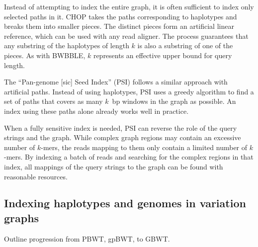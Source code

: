 Instead of attempting to index the entire graph, it is often sufficient to index only selected paths in it.
CHOP \cite{Mokveld_2018} takes the paths corresponding to haplotypes and breaks them into smaller pieces.
The distinct pieces form an artificial linear reference, which can be used with any read aligner.
The process guarantees that any substring of the haplotypes of length $k$ is also a substring of one of the pieces.
As with BWBBLE, $k$ represents an effective upper bound for query length.

The ``Pan-genome [sic] Seed Index'' (PSI) \cite{Ghaffaari_2019} follows a similar approach with artificial paths.
Instead of using haplotypes, PSI uses a greedy algorithm to find a set of paths that covers as many $k$~bp windows in the graph as possible.
An index using these paths alone already works well in practice.

When a fully sensitive index is needed, PSI can reverse the role of the query strings and the graph.
While complex graph regions may contain an excessive number of $k$-mers, the reads mapping to them only contain a limited number of $k$-mers.
By indexing a batch of reads and searching for the complex regions in that index, all mappings of the query strings to the graph can be found with reasonable resources.


\subsection{Indexing haplotypes and genomes in variation graphs}

Outline progression from PBWT, gpBWT, to GBWT.











